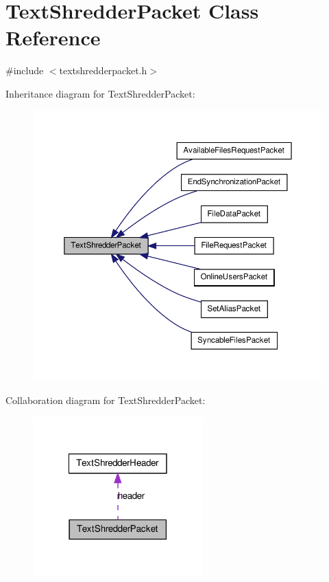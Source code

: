 \hypertarget{class_text_shredder_packet}{
\section{TextShredderPacket Class Reference}
\label{class_text_shredder_packet}
}


{\ttfamily \#include $<$textshredderpacket.h$>$}



Inheritance diagram for TextShredderPacket:\nopagebreak
\begin{figure}[H]
\begin{center}
\leavevmode
\includegraphics[width=368pt]{class_text_shredder_packet__inherit__graph}
\end{center}
\end{figure}


Collaboration diagram for TextShredderPacket:\nopagebreak
\begin{figure}[H]
\begin{center}
\leavevmode
\includegraphics[width=186pt]{class_text_shredder_packet__coll__graph}
\end{center}
\end{figure}
